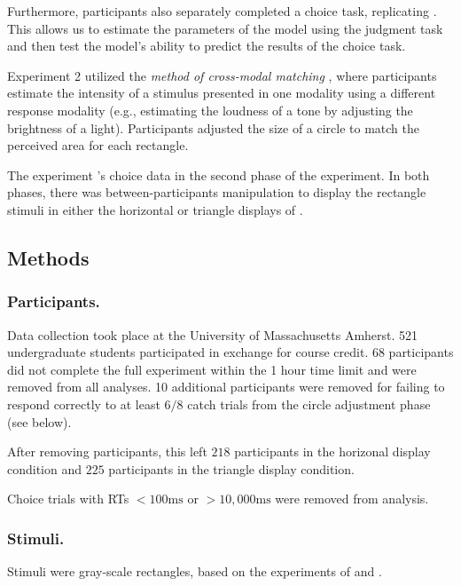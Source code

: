 Furthermore, participants also separately completed a choice task, replicating \textcite{spektorWhenGoodLooks2018b}. This allows us to estimate the parameters of the model using the judgment task and then test the model's ability to predict the results of the choice task. 

Experiment 2 utilized the \textit{method of cross-modal matching} \parencite{stevensCrossmodalityMatchingBrightness1965}, where participants estimate the intensity of a stimulus presented in one modality using a different response modality (e.g., estimating the loudness of a tone by adjusting the brightness of a light). Participants adjusted the size of a circle to match the perceived area for each rectangle. 

The experiment  \textcite{spektorWhenGoodLooks2018b}'s choice data in the second phase of the experiment. In both phases, there was between-participants manipulation to display the rectangle stimuli in either the horizontal or triangle displays of \textcite{spektorWhenGoodLooks2018b}.

\subsection{Methods}
\subsubsection{Participants.}
Data collection took place at the University of Massachusetts Amherst. 521 undergraduate students participated in exchange for course credit. 68 participants did not complete the full experiment within the 1 hour time limit and were removed from all analyses. 10 additional participants were removed for failing to respond correctly to at least $6/8$ catch trials from the circle adjustment phase (see below). 

After removing participants, this left $218$ participants in the horizonal display condition and $225$ participants in the triangle display condition. 

Choice trials with RTs $<100\text{ms}$ or $>10,000\text{ms}$ were removed from analysis.

\subsubsection{Stimuli.}
Stimuli were gray-scale rectangles, based on the experiments of \textcite{spektorWhenGoodLooks2018b} and \textcite{trueblood2013not}. 

